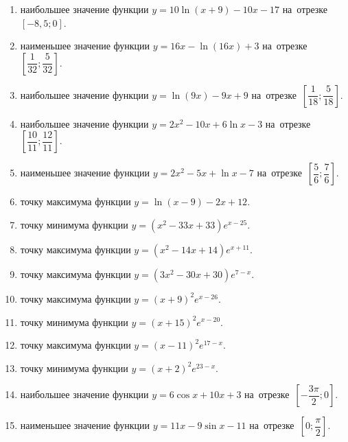 \documentclass[a4paper,10pt]{article}
\begin{document}
\begin{enumerate}
\item {} наибольшее значение функции $y = 10\ln \left(x+9\right)-10x -17$ на~отрезке~$\left[-8,5;0\right]$.

\item {} наименьшее значение функции $y = 16x-\ln \left(16x\right)+3$ на~отрезке~$\left[\dfrac{1}{32};\dfrac{5}{32}\right]$.

\item {} наибольшее значение функции $y = \ln \left(9x\right)-9x+9$ на~отрезке~$\left[\dfrac{1}{18};\dfrac{5}{18}\right]$.

\item {} наибольшее значение функции $y=2x^2-10x+6\ln x-3$ на~отрезке~$\left[\dfrac{10}{11};\dfrac{12}{11}\right]$.

\item {} наименьшее значение функции $y=2x^2-5x+\ln x-7$ на~отрезке~$\left[\dfrac{5}{6};\dfrac{7}{6}\right]$.

\item {} точку максимума функции $y=\ln \left(x-9\right)-2x+12$.

\item {} точку минимума функции $y=\left(x^2-33x+33\right)e^{x-25}$.

\item {} точку максимума функции $y=\left(x^2-14x+14\right)e^{x+11}$.

\item {} точку максимума функции $y=\left(3x^2-30x+30\right)e^{7-x}$.

\item {} точку максимума функции $y=\left(x +9\right)^2e^{x-26}$.

\item {} точку минимума функции $y=\left(x +15\right)^2e^{x-20}$.

\item {} точку максимума функции $y=\left(x -11\right)^2e^{17-x}$.

\item {} точку минимума функции $y=\left(x +2\right)^2e^{23-x}$.

\item {} наибольшее значение функции $y=6\cos x+10x +3$ на~отрезке~$\left[-\dfrac{3\pi }{2};0\right]$.

\item {} наименьшее значение функции $y=11x-9\sin x -11$ на~отрезке~$\left[0;\dfrac{\pi }{2}\right]$.


\end{enumerate}
\end{document}
